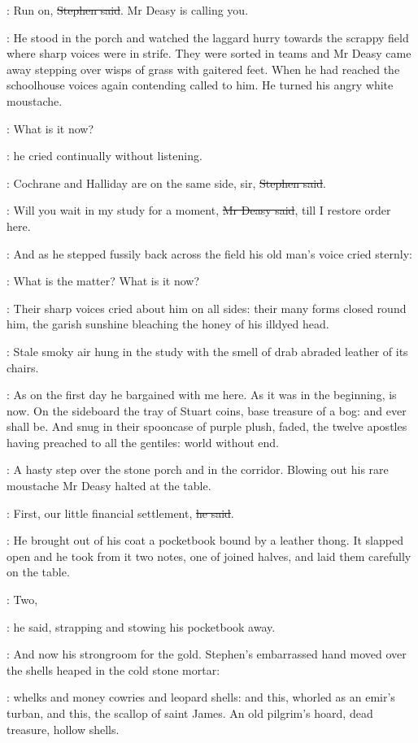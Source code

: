 \Stephen:
Run on, \sout{Stephen said}.
Mr Deasy is calling you.

:
He stood in the porch and watched the laggard hurry towards the scrappy field
where sharp voices were in strife.
They were sorted in teams
and Mr Deasy came away stepping over wisps of grass with gaitered feet.
When he had reached the schoolhouse
voices again contending called to him.
He turned his angry white moustache.

\deasy:
What is it now?

:
he cried continually without listening.

\Stephen:
Cochrane and Halliday are on the same side, sir, \sout{Stephen said}.

\deasy:
Will you wait in my study for a moment, \sout{Mr Deasy said},
till I restore order here.


:
And as he stepped fussily back across the field
his old man's voice cried sternly:

\deasy:
What is the matter?
What is it now?

:
Their sharp voices cried about him on all sides:
their many forms closed round him,
the garish sunshine bleaching the honey of his illdyed head.

:
Stale smoky air hung in the study
with the smell of drab abraded leather of its chairs.

\StephenInt:
As on the first day he bargained with me here.
As it was in the beginning, is now.
On the sideboard the tray of Stuart coins, base treasure of a bog:
and ever shall be.
And snug in their spooncase of purple plush, faded,
the twelve apostles having preached to all the gentiles:
world without end.

:
A hasty step over the stone porch and in the corridor.
Blowing out his rare moustache
Mr Deasy halted at the table.

\deasy:
First, our little financial settlement, \sout{he said}.

:
He brought out of his coat a pocketbook bound by a leather thong.
It slapped open and he took from it two notes, one of joined halves,
and laid them carefully on the table.

\deasy:
Two,

:
he said, strapping and stowing his pocketbook away.

:
And now his strongroom for the gold.
Stephen's embarrassed hand moved over the shells heaped in the cold stone mortar:

\StephenInt:
whelks and money cowries and leopard shells:
and this, whorled as an emir's turban,
and this, the scallop of saint James.
An old pilgrim's hoard, dead treasure, hollow shells.

